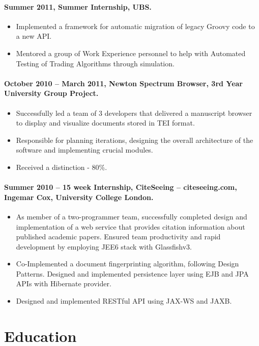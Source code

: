 \documentclass[11pt, a4paper]{article}
\newlength{\wideitemsep}
\let\olditem\item
\renewcommand{\item}{\setlength{\itemsep}{\wideitemsep}\olditem}
\begin{document}
\paragraph{Summer 2011, Summer Internship, UBS.}
\begin{itemize}
\item Implemented a framework for automatic migration of legacy Groovy code to a new API.
\item Mentored a group of Work Experience personnel to help with Automated Testing of Trading Algorithms through simulation.
\end{itemize}

\paragraph{October 2010 – March 2011, Newton Spectrum Browser, 3rd Year University Group Project.}
\begin{itemize}
\item Successfully led a team of 3 developers that delivered a manuscript browser to display and visualize documents stored in TEI format.
\item Responsible for planning iterations, designing the overall architecture of the software and implementing crucial modules. 
\item Received a distinction - 80\%.
\end{itemize}

\paragraph{Summer 2010 – 15 week Internship, CiteSeeing – citeseeing.com, Ingemar Cox, University College London.}
\begin{itemize}
\item As member of a two-programmer team, successfully completed design and implementation of a web service that provides citation information about published academic papers. Ensured team productivity and rapid development by employing JEE6 stack with Glassfishv3.
\item Co-Implemented a document fingerprinting algorithm, following Design Patterns. Designed and implemented persistence layer using EJB and JPA APIs with Hibernate provider.
\item Designed and implemented RESTful API using JAX-WS and JAXB.
\end{itemize}

\section*{Education}
\end{document}
